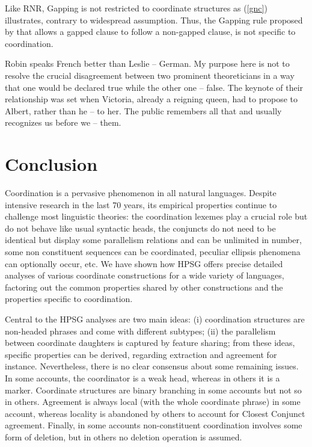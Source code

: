\documentclass[output=paper
                ,modfonts
                ,nonflat
	        ,collection
	        ,collectionchapter
	        ,collectiontoclongg
 	        ,biblatex
                ,babelshorthands
                ,newtxmath
                ,draftmode
                ,colorlinks, citecolor=brown
]{./langsci/langscibook}
\begin{document}
{Like RNR, Gapping is not restricted to coordinate structures as (\ref{gnc}) illustrates, contrary to
widespread assumption.   Thus, the Gapping rule proposed by \citet{sangheepark}  that allows a gapped clause to follow a non-gapped clause, is not specific to coordination. 

\begin{exe}
\ex 
\begin{xlista}
\ex Robin speaks French better than Leslie -- German.
\ex My purpose here is not to resolve the crucial disagreement between two prominent theoreticians in a way that one would be declared true while the other one -- false.
\ex The keynote of their relationship was set when Victoria, already a reigning queen,
had to propose to Albert, rather than he -- to her.
\ex The public remembers all that and usually recognizes us before we -- them.\\
\citep[]{sangheepark}
\end{xlista}\label{gnc}
\end{exe}




\section{Conclusion}

Coordination is a pervasive phenomenon in all natural languages. Despite intensive research in the last 70 years, its empirical properties continue to challenge most linguistic theories:  the coordination lexemes play a crucial role but do not behave like usual syntactic heads, the conjuncts do not need to be identical but display some parallelism relations and can be unlimited in number, some non constituent sequences can be coordinated, peculiar ellipsis phenomena can optionally occur,  etc. We have shown how HPSG offers precise detailed analyses of various coordinate constructions for a wide variety of languages, factoring out the common properties shared by other constructions and the properties specific to coordination.

Central to the HPSG analyses are two main ideas: (i) coordination structures are non-headed phrases and come with different subtypes; (ii) the parallelism between coordinate daughters is captured by feature sharing; from these ideas, specific properties can be derived, regarding extraction and agreement for instance. Nevertheless, there is no clear consensus about some remaining issues. In some accounts, the coordinator is a weak head, whereas in others it is a marker. Coordinate structures are binary branching in some accounts but not so in others. Agreement is always local (with the whole coordinate phrase) in some account, whereas locality is abandoned by others to account for Closest Conjunct agreement. Finally, in some accounts non-constituent coordination involves some form of deletion, but in others no deletion operation is assumed.

}%
 
\end{document}
